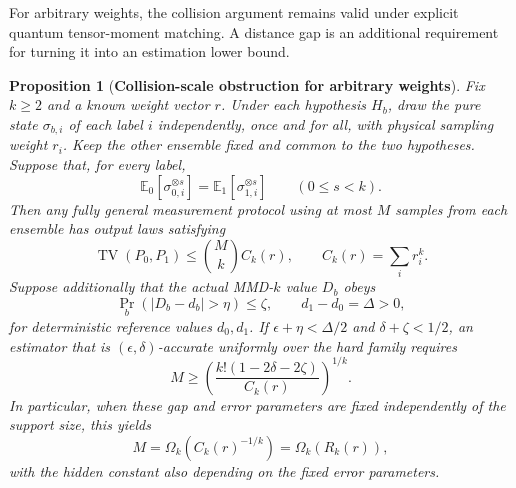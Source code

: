 \documentclass[aps,prx,reprint,superscriptaddress,amsmath,amssymb,longbibliography,floatfix]{revtex4-2}
\theoremstyle{plain}
\newtheorem{proposition}[theorem]{Proposition}
\theoremstyle{definition}
\theoremstyle{remark}
\begin{document}
For arbitrary weights, the collision argument remains valid under explicit quantum tensor-moment matching. A distance gap is an additional requirement for turning it into an estimation lower bound.

\begin{proposition}[\textbf{Collision-scale obstruction for arbitrary weights}]
    \label{prop: arbitrary nonuniform collision lower}
    Fix \(k\ge2\) and a known weight vector \(r\). Under each hypothesis \(H_b\), draw the pure state \(\sigma_{b,i}\) of each label \(i\) independently, once and for all, with physical sampling weight \(r_i\). Keep the other ensemble fixed and common to the two hypotheses. Suppose that, for every label,
    \begin{equation}
        \mathbb E_0[\sigma_{0,i}^{\otimes s}]
        =\mathbb E_1[\sigma_{1,i}^{\otimes s}]
        \qquad(0\le s<k).
\label{eq:app-arbitrary-weights-moment-matching}
\end{equation}
    Then any fully general measurement protocol using at most \(M\) samples from each ensemble has output laws satisfying
    \begin{equation}
        \operatorname{TV}(P_0,P_1)
        \le
        \binom{M}{k}C_k(r),
        \qquad
        C_k(r)=\sum_i r_i^k.
        \label{eq: arbitrary nonuniform TV collision}
    \end{equation}
    Suppose additionally that the actual MMD-\(k\) value \(D_b\) obeys
    \begin{equation}
        \Pr_b(|D_b-d_b|>\eta)\le\zeta,
        \qquad d_1-d_0=\Delta>0,
\label{eq:app-arbitrary-weights-gap-assumption}
\end{equation}
    for deterministic reference values \(d_0,d_1\). If \(\epsilon+\eta<\Delta/2\) and \(\delta+\zeta<1/2\), an estimator that is \((\epsilon,\delta)\)-accurate uniformly over the hard family requires
    \begin{equation}
        M\ge\left(\frac{k!(1-2\delta-2\zeta)}{C_k(r)}\right)^{1/k}.
    \end{equation}
    In particular, when these gap and error parameters are fixed independently of the support size, this yields
    \begin{equation}
        M=\Omega_k\!\left(C_k(r)^{-1/k}\right)
         =\Omega_k(R_k(r)),
\label{eq:app-arbitrary-weights-collision-scale}
\end{equation}
    with the hidden constant also depending on the fixed error parameters.
\end{proposition}
\end{document}
